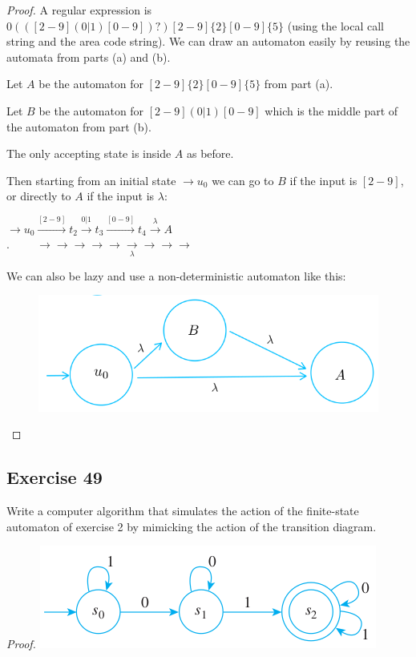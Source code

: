\documentclass[14pt]{extarticle}
\begin{document}
\begin{proof}
A regular expression is \(0(([2-9](0|1)[0-9])?)[2-9]\{2\}[0-9]\{5\}\) (using the local call string and the area code 
string). We can draw an automaton easily by reusing the automata from parts (a) and (b). 

Let \(A\) be the automaton for \([2-9]\{2\}[0-9]\{5\}\) from part (a). 

Let \(B\) be the automaton for \([2-9](0|1)[0-9]\) which is the middle part of the automaton from part (b).

The only accepting state is inside \(A\) as before.

Then starting from an initial state \(\to u_0\) we can go to \(B\) if the input is \([2-9]\), or directly to \(A\) if the
input is \(\lambda\):

\(\to u_0 \overset{[2-9]}{\to} t_2 \overset{0|1}{\to} t_3 \overset{[0-9]}{\to} t_4 \overset{\lambda}{\to} A\) \\
\(.\hspace{1cm}\to\to\to\to\to\underset{\lambda}{\to}\to\to\to\)

We can also be lazy and use a non-deterministic automaton like this:
\begin{figure}[ht!]
\centering
\includegraphics[scale=0.4]{../images/12.2.48.c.png}
\end{figure}
\end{proof}

\subsection{Exercise 49}
Write a computer algorithm that simulates the action of the finite-state automaton of exercise 2 by mimicking the action 
of the transition diagram.

{\it Proof.}
\includegraphics[scale=0.5]{../images/12.2.2.png}
\end{document}
